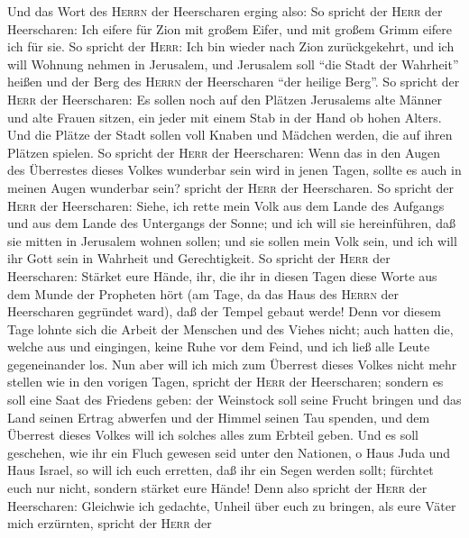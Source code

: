  Und das Wort des \textsc{Herrn} der Heerscharen erging
also:  So spricht der \textsc{Herr} der Heerscharen: Ich
eifere für Zion mit großem Eifer, und mit großem Grimm eifere ich für
sie.  So spricht der \textsc{Herr}: Ich bin wieder nach
Zion zurückgekehrt, und ich will Wohnung nehmen in Jerusalem, und
Jerusalem soll ``die Stadt der Wahrheit'' heißen und der Berg des
\textsc{Herrn} der Heerscharen ``der heilige Berg''.  So
spricht der \textsc{Herr} der Heerscharen: Es sollen noch auf den
Plätzen Jerusalems alte Männer und alte Frauen sitzen, ein jeder mit
einem Stab in der Hand ob hohen Alters.  Und die Plätze
der Stadt sollen voll Knaben und Mädchen werden, die auf ihren Plätzen
spielen.  So spricht der \textsc{Herr} der Heerscharen:
Wenn das in den Augen des Überrestes dieses Volkes wunderbar sein wird
in jenen Tagen, sollte es auch in meinen Augen wunderbar sein? spricht
der \textsc{Herr} der Heerscharen.  So spricht der
\textsc{Herr} der Heerscharen: Siehe, ich rette mein Volk aus dem Lande
des Aufgangs und aus dem Lande des Untergangs der Sonne; 
und ich will sie hereinführen, daß sie mitten in Jerusalem wohnen
sollen; und sie sollen mein Volk sein, und ich will ihr Gott sein in
Wahrheit und Gerechtigkeit.  So spricht der \textsc{Herr}
der Heerscharen: Stärket eure Hände, ihr, die ihr in diesen Tagen diese
Worte aus dem Munde der Propheten hört (am Tage, da das Haus des
\textsc{Herrn} der Heerscharen gegründet ward), daß der Tempel gebaut
werde!  Denn vor diesem Tage lohnte sich die Arbeit der
Menschen und des Viehes nicht; auch hatten die, welche aus und
eingingen, keine Ruhe vor dem Feind, und ich ließ alle Leute
gegeneinander los.  Nun aber will ich mich zum Überrest
dieses Volkes nicht mehr stellen wie in den vorigen Tagen, spricht der
\textsc{Herr} der Heerscharen;  sondern es soll eine Saat
des Friedens geben: der Weinstock soll seine Frucht bringen und das Land
seinen Ertrag abwerfen und der Himmel seinen Tau spenden, und dem
Überrest dieses Volkes will ich solches alles zum Erbteil geben.
 Und es soll geschehen, wie ihr ein Fluch gewesen seid
unter den Nationen, o Haus Juda und Haus Israel, so will ich euch
erretten, daß ihr ein Segen werden sollt; fürchtet euch nur nicht,
sondern stärket eure Hände!  Denn also spricht der
\textsc{Herr} der Heerscharen: Gleichwie ich gedachte, Unheil über euch
zu bringen, als eure Väter mich erzürnten, spricht der \textsc{Herr} der
